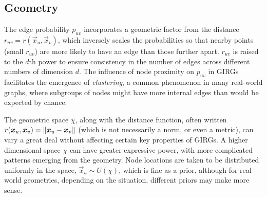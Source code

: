 




\subsection{Geometry}
The edge probability $p_{uv}$ incorporates a geometric factor from the distance $r_{uv} = r(\vec{x}_u, \vec{x}_v)$, which inversely scales the probabilities so that nearby points (small $r_{uv}$) are more likely to have an edge than those further apart.
$r_{uv}$ is raised to the $d$th power to ensure consistency in the number of edges across different numbers of dimension $d$.
The influence of node proximity on $p_{uv}$ in GIRGs facilitates the emergence of \textit{clustering}, a common phenomenon in many real-world graphs, where subgroups of nodes might have more internal edges than would be expected by chance.

The geometric space $\chi$, along with the distance function, often written $r(\bm{x}_u, \bm{x}_v) = \left\lVert \bm{x}_u - \bm{x}_v\right\rVert$ (which is not necessarily a norm, or even a metric), can vary a great deal without affecting certain key properties of GIRGs. A higher dimensional space $\chi$ can have greater expressive power, with more complicated patterns emerging from the geometry. Node locations are taken to be distributed uniformly in the space, $\vec{x}_u \sim U(\chi)$, which is fine as a prior, although for real-world geometries, depending on the situation, different priors may make more sense.




